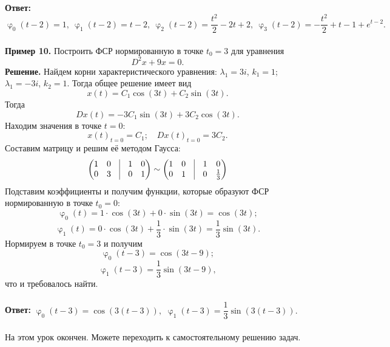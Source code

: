 \documentclass[a4paper, 12pt]{article}
\renewcommand{\varphi}{\upvarphi}
\begin{document}
\textbf{Ответ:} $\varphi_0(t-2) = 1,\ \varphi_1(t-2) = t-2,\ \varphi_2(t-2) = \dfrac{t^2}{2}-2t+2,\ \varphi_3(t-2) = -\dfrac{t^2}{2} + t - 1 + e^{t-2}.$
\\\\
\textbf{Пример 10.} Построить ФСР нормированную в точке $t_0 = 3$ для уравнения $$D^2x + 9x = 0.$$
	\textbf{Решение.} Найдем корни характеристического уравнения: $\lambda_1 = 3i$, $k_1 = 1$; $\lambda_1 = -3i$, $k_2 = 1$. Тогда общее решение имеет вид $$x(t) = C_1\cos(3t) + C_2\sin(3t).$$
 Тогда $$Dx(t) = -3C_1\sin(3t) + 3C_2\cos(3t).$$ Находим значения в точке $t =0$:
	$$x(t)_{t = 0} = C_1;\quad Dx(t)_{t = 0} = 3C_2.$$ Составим матрицу и решим её методом Гаусса:
	$$\begin{pmatrix}
		1 & 0 & \vline & 1 & 0\\
		0 & 3 & \vline & 0 & 1
	\end{pmatrix}\sim \begin{pmatrix}
	1 & 0 & \vline & 1 & 0\\
	0 & 1 & \vline & 0 & \frac{1}{3}
\end{pmatrix}$$
 Подставим коэффициенты и получим функции, которые образуют ФСР нормированную в точке $t_0 = 0$: $$\varphi_0(t) = 1\cdot \cos(3t) + 0\cdot \sin (3t) = \cos(3t);$$ $$\varphi_1(t) = 0\cdot \cos(3t) + \dfrac{1}{3}\cdot \sin (3t) = \dfrac{1}{3}\sin(3t).$$
Нормируем в точке $t_0 = 3$ и получим
$$\varphi_0(t - 3) = \cos(3t - 9);$$
$$\varphi_1(t - 3) = \dfrac{1}{3}\sin(3t - 9),$$
что и требовалось найти.\\\\
\textbf{Ответ:} $\varphi_0(t - 3) = \cos(3(t - 3)),$
$\varphi_1(t - 3) = \dfrac{1}{3}\sin(3(t - 3)).$\\\\
На этом урок окончен. Можете переходить к самостоятельному решению задач.
 
\end{document}
